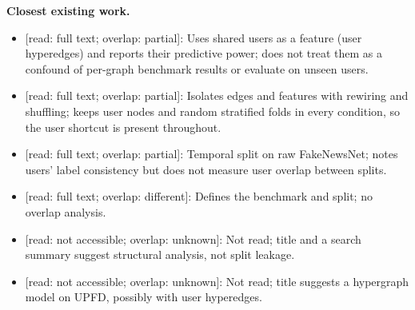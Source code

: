 \documentclass[11pt,a4paper]{article}
\begin{document}
\textbf{Closest existing work.}
\begin{itemize}
\item \cite{jeong2022hgfnd} [read: full text; overlap: partial]: Uses shared users as a feature (user hyperedges) and reports their predictive power; does not treat them as a confound of per-graph benchmark results or evaluate on unseen users.
\item \cite{karn2025structure} [read: full text; overlap: partial]: Isolates edges and features with rewiring and shuffling; keeps user nodes and random stratified folds in every condition, so the user shortcut is present throughout.
\item \cite{kim2025dawn} [read: full text; overlap: partial]: Temporal split on raw FakeNewsNet; notes users' label consistency but does not measure user overlap between splits.
\item \cite{dou2021upfd} [read: full text; overlap: different]: Defines the benchmark and split; no overlap analysis.
\item \cite{bryla2026networks} [read: not accessible; overlap: unknown]: Not read; title and a search summary suggest structural analysis, not split leakage.
\item \cite{rai2025hypergraph} [read: not accessible; overlap: unknown]: Not read; title suggests a hypergraph model on UPFD, possibly with user hyperedges.
\end{itemize}
\end{document}
